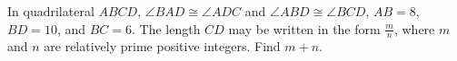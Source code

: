 In quadrilateral $ABCD$, $\angle{BAD}\cong\angle{ADC}$ and $\angle{ABD}\cong\angle{BCD}$, $AB=8$, $BD=10$, and $BC=6$. The length $CD$ may be written in the form $\frac{m}{n}$, where $m$ and $n$ are relatively prime positive integers. Find $m+n$.